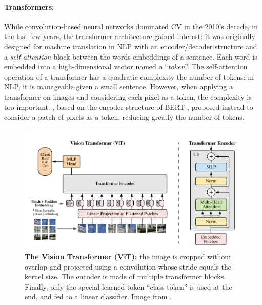 \paragraph{Transformers:}While convolution-based neural networks dominated \acf{CV} in the 2010's
decade, in the last few years, the transformer architecture gained interest: it was originally
designed for machine translation in \ac{NLP} \citep{vaswani2017transformer} with an encoder/decoder
structure and a \textit{self-attention} block between the words embeddings of a sentence. Each word is
embedded into a high-dimensional vector named a ``\textit{token}''. The self-attention operation of a
transformer has a quadratic complexity \wrt the number of tokens: in \ac{NLP}, it is manageable
given a small sentence. However, when applying a transformer on images and considering each pixel
as a token, the complexity is too important. \cite{dosovitskiy2020vit}, based on the encoder
structure of BERT \citep{devlin2018bert}, proposed instead to consider a patch of pixels as a token,
reducing greatly the number of tokens.

\begin{figure}[tb]
      \begin{center}
            \includegraphics[width=\linewidth]{images/related/vit.png}
      \end{center}
      \caption{\textbf{The Vision Transformer (ViT):} the image is cropped without overlap and
            projected using a convolution whose stride equals the kernel size. The encoder is made of
            multiple transformer blocks. Finally, only the special learned token ``class token'' is used
            at the end, and fed to a linear classifier. Image from \cite{dosovitskiy2020vit}.}
      \label{fig:related_vit}
\end{figure}

